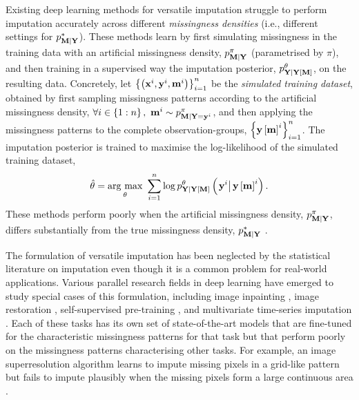\documentclass[../thesis.tex]{subfiles}
\begin{document}
Existing deep learning methods for versatile imputation struggle to perform imputation accurately across different \textit{missingness densities} (i.e., different settings for $\myfunc{p}^{*}_{\mygroup{\myrv{m}} | \mygroup{\myrv{y}}}$). These methods learn by first simulating missingness in the training data with an artificial missingness density, $\myfunc{p}^{\pi}_{\mygroup{\myrv{m}} | \mygroup{\myrv{y}}}$ (parametrised by $\pi$), and then training in a supervised way the imputation posterior, $\myfunc{p}^{\theta}_{\mygroup{\myrv{y}} | \mygroup{\myrv{y}} \left[ \mygroup{\myrv{m}} \right]}$, on the resulting data. Concretely, let $\left\{ \left( \mathbf{{x}}^i, \mathbf{{y}}^i, \mathbf{{m}}^i \right) \right\}_{i=1}^{n}$ be the \textit{simulated training dataset}, obtained by first sampling missingness patterns according to the artificial missingness density, $\forall i \in \left\{ 1:\mycnt{n} \right\}, ~ \mygroup{\myvect{m}}^i \sim \myfunc{p}^{\pi}_{\mygroup{\myrv{m}} | \mygroup{\myrv{y}} = \mygroup{\myvect{y}}^i}$, and then applying the missingness patterns to the complete observation-groups, $\left\{ \mathbf{{y}} \left[ \mathbf{{m}} \right]^i \right\}_{i=1}^{n}$. The imputation posterior is trained to maximise the log-likelihood of the simulated training dataset,
\[
    \hat{\theta} = \underset{\theta}{\mathrm{arg~max}} ~ \sum_{i=1}^{\mycnt{n}} \log \myfunc{p}^{\theta}_{\mygroup{\myrv{y}} | \mygroup{\myrv{y}} \left[ \mygroup{\myrv{m}} \right]} \left( \left. \mygroup{\myvect{y}}^i \right\vert \mygroup{\myvect{y}} \left[ \mygroup{\myvect{m}} \right]^i \right).
\]
These methods perform poorly when the artificial missingness density, $\myfunc{p}^{\pi}_{\mygroup{\myrv{m}} | \mygroup{\myrv{y}}}$, differs substantially from the true missingness density, $\myfunc{p}^{*}_{\mygroup{\myrv{m}} | \mygroup{\myrv{y}}}$ \citep{quanDeepLearningBasedImage2024}. 

The formulation of versatile imputation has been neglected by the statistical literature on imputation even though it is a common problem for real-world applications. Various parallel research fields in deep learning have emerged to study special cases of this formulation, including image inpainting \citep{quanDeepLearningBasedImage2024}, image restoration \citep{suSurveyDeepLearning2022}, self-supervised pre-training \citep{heMaskedAutoencodersAre2022, devlinBERTPretrainingDeep2019,brownLanguageModelsAre2020a}, and multivariate time-series imputation \citep{kazijevsDeepImputationMissing2023}. Each of these tasks has its own set of state-of-the-art models that are fine-tuned for the characteristic missingness patterns for that task but that perform poorly on the missingness patterns characterising other tasks. For example, an image superresolution algorithm learns to impute missing pixels in a grid-like pattern but fails to impute plausibly when the missing pixels form a large continuous area \citep{chanSuperresolutionImageReconstruction2007}.
\end{document}
